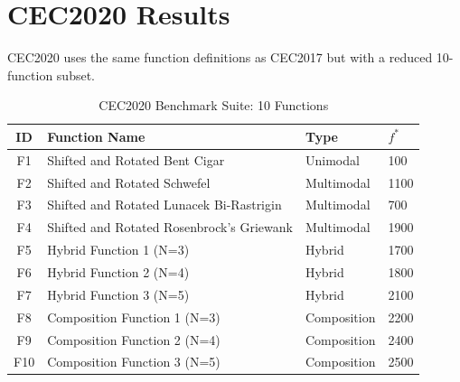 \documentclass[11pt]{article}
\begin{document}
\section{CEC2020 Results}

CEC2020 uses the same function definitions as CEC2017 but with a reduced 10-function subset.

\begin{table}[ht]
\centering
\caption{CEC2020 Benchmark Suite: 10 Functions}
\label{tab:cec2020_functions}
\begin{tabular}{@{}clll@{}}
\toprule
\textbf{ID} & \textbf{Function Name} & \textbf{Type} & \textbf{$f^*$} \\
\midrule
F1  & Shifted and Rotated Bent Cigar          & Unimodal      & 100  \\
F2  & Shifted and Rotated Schwefel            & Multimodal    & 1100 \\
F3  & Shifted and Rotated Lunacek Bi-Rastrigin& Multimodal    & 700  \\
F4  & Shifted and Rotated Rosenbrock's Griewank & Multimodal  & 1900 \\
F5  & Hybrid Function 1 (N=3)                 & Hybrid        & 1700 \\
F6  & Hybrid Function 2 (N=4)                 & Hybrid        & 1800 \\
F7  & Hybrid Function 3 (N=5)                 & Hybrid        & 2100 \\
F8  & Composition Function 1 (N=3)            & Composition   & 2200 \\
F9  & Composition Function 2 (N=4)            & Composition   & 2400 \\
F10 & Composition Function 3 (N=5)            & Composition   & 2500 \\
\bottomrule
\end{tabular}
\end{table}
\end{document}
